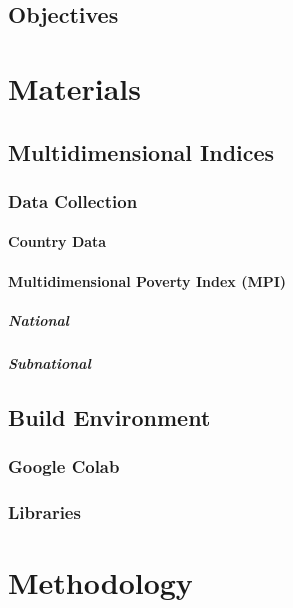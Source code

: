 \documentclass{swfuthesise}
\begin{document}
\section{Objectives}
\lipsum[8]

\chapter{Materials}
\lipsum[9]
\section{Multidimensional Indices}
\lipsum[10]
\subsection{Data Collection}
\lipsum[11]
\subsubsection{Country Data}
\lipsum[12]

\subsubsection{Multidimensional Poverty Index (MPI)}
\lipsum[13]


\paragraph{National}
\lipsum[14]

\paragraph{Subnational}
\lipsum[15]

\section{Build Environment}
\lipsum[16]

\subsection{Google Colab}
\lipsum[17]

\subsection{Libraries}
\lipsum[18]

\chapter{Methodology}
\lipsum[19]
\end{document}
